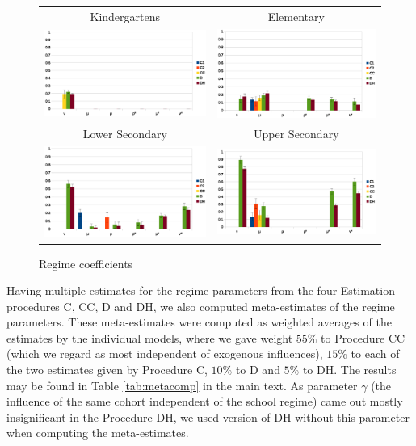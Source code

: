 \documentclass[fleqn,10pt]{wlscirep}
\begin{document}
\begin{figure}
\begin{center}
\begin{tabular}{cc}
Kindergartens & Elementary \\
\includegraphics[width=6cm]{kcoef.eps} 
&
\includegraphics[width=6cm]{fdcoef.eps} \\ \hline
Lower Secondary & Upper Secondary \\
\includegraphics[width=6cm]{sdcoef.eps} 
&
\includegraphics[width=6cm]{seccoef.eps} 
\end{tabular}
\caption{Regime coefficients}
\label{fig:comp}
\end{center}
\end{figure}

Having multiple estimates for the regime parameters from the four Estimation procedures C, CC, D and DH, we also computed meta-estimates of the regime parameters. These meta-estimates were computed as weighted averages of the estimates by the individual models, where we gave weight $55\%$ to Procedure CC (which we regard as most independent of exogenous influences), $15\%$ to each of the two estimates given by Procedure C, $10\%$ to D and $5 \%$ to DH. The results may be found in Table \ref{tab:metacomp} in the main text. As parameter $\gamma$ (the influence of the same cohort independent of the school regime) came out mostly insignificant in the Procedure DH, we used version of DH without this parameter when computing the meta-estimates.
\end{document}
